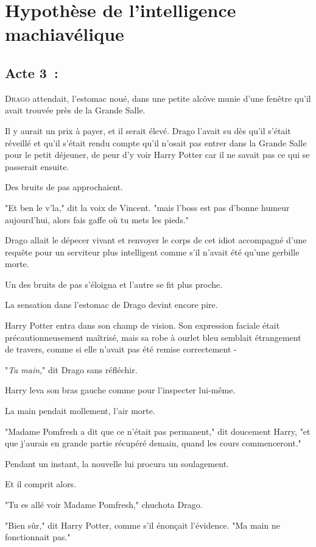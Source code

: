 \chapter{Hypothèse de l'intelligence machiavélique}

\section{Acte 3~:}

\lettrine{D}{rago} attendait, l'estomac noué, dans une petite alcôve munie d'une fenêtre qu'il avait trouvée près de la Grande Salle.

Il y aurait un prix à payer, et il serait élevé. Drago l'avait su dès qu'il s'était réveillé et qu'il s'était rendu compte qu'il n'osait pas entrer dans la Grande Salle pour le petit déjeuner, de peur d'y voir Harry Potter car il ne savait pas ce qui se passerait ensuite.

Des bruits de pas approchaient.

"Et ben le v'la," dit la voix de Vincent. "mais l'boss est pas d'bonne humeur aujourd'hui, alors fais gaffe où tu mets les pieds."

Drago allait le dépecer vivant et renvoyer le corps de cet idiot accompagné d'une requête pour un serviteur plus intelligent comme s'il n'avait été qu'une gerbille morte.

Un des bruits de pas s'éloigna et l'autre se fit plus proche.

La sensation dans l'estomac de Drago devint encore pire.

Harry Potter entra dans son champ de vision. Son expression faciale était précautionneusement maîtrisé, mais sa robe à ourlet bleu semblait étrangement de travers, comme si elle n'avait pas été remise correctement -

"\emph{Ta main}," dit Drago sans réfléchir.

Harry leva son bras gauche comme pour l'inspecter lui-même.

La main pendait mollement, l'air morte.

"Madame Pomfresh a dit que ce n'était pas permanent," dit doucement Harry, "et que j'aurais en grande partie récupéré demain, quand les cours commenceront."

Pendant un instant, la nouvelle lui procura un soulagement.

Et il comprit alors.

"Tu es allé voir Madame Pomfresh," chuchota Drago.

"Bien sûr," dit Harry Potter, comme s'il énonçait l'évidence. "Ma main ne fonctionnait pas."

